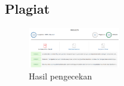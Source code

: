 \subsection{Plagiat}
\begin{figure}[H]
  \centering
  \includegraphics[width=4cm]{figures/1174035/chapter8/plagiat.png}
  \caption{Hasil pengecekan}
  \end{figure}